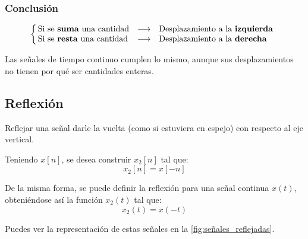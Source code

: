 \documentclass[a4paper]{book}
\begin{document}
\subsubsection{Conclusión}
\[\left\{ \begin{array}{l c l}
		\! \! \textrm{Si se \textbf{suma} una cantidad}  & \longrightarrow & \textrm{Desplazamiento a la \textbf{izquierda}} \\
		\! \! \textrm{Si se \textbf{resta} una cantidad} & \longrightarrow & \textrm{Desplazamiento a la \textbf{derecha}}
	\end{array} \right.
\]

\begin{nota}
	Las señales de tiempo continuo cumplen lo mismo, aunque sus desplazamientos no tienen por qué ser cantidades enteras.
\end{nota}

\subsection{Reflexión}

Reflejar una señal darle la vuelta (como si estuviera en espejo) con respecto al eje vertical.

\begin{ejemplo}
	Teniendo $x[n]$, se desea construir $x_2[n]$ tal que: \[x_2[n] = x[-n] \]
\end{ejemplo}

\begin{ejemplo}
	De la misma forma, se puede definir la reflexión para una señal continua $x(t)$, obteniéndose así la función $x_2(t)$ tal que: \[x_2(t) = x(-t)\]
\end{ejemplo}

Puedes ver la representación de estas señales en la \autoref{fig:señales_reflejadas}.
\end{document}
